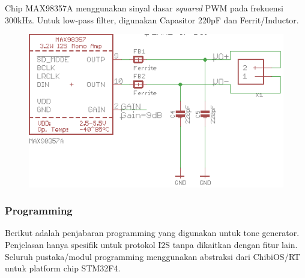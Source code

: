 \documentclass[12pt,]{article}
\begin{document}
	\newpage
	Chip MAX98357A menggunakan sinyal dasar \textit{squared} PWM pada frekuensi 300kHz.
	Untuk low-pass filter, digunakan Capasitor 220pF dan Ferrit/Inductor.
	\begin{figure}[H]
		\centering
		\includegraphics[width=0.6\linewidth]{images/max98357A}
	\end{figure}

	\subsubsection{Programming}
	Berikut adalah penjabaran programming yang digunakan untuk tone generator.
	Penjelasan hanya spesifik untuk protokol I2S tanpa dikaitkan dengan fitur lain.
	Seluruh pustaka/modul programming menggunakan abstraksi dari ChibiOS/RT untuk platform chip STM32F4.
\end{document}
